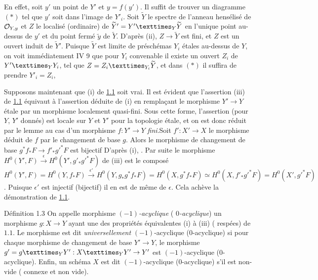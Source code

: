 \documentclass[10pt]{../fichiers-configuration-latex/smfart}
\begin{document}
En effet, soit $y'$ un point de $Y'$ et $y=f(y')$. Il suffit de
trouver un diagramme $({\ast})$ tel que $y'$ soit dans l'image de
$Y'_i$. Soit $\widetilde{Y}$ le spectre de l'anneau hensélisé de
${\mathcal O}_{Y,y}$ 
et $Z$ le localisé (ordinaire) de
$\widetilde{Y}'=\fprod{Y'}{\widetilde{Y}}{Y}$ en l'unique point
au-dessus de $y'$ et du point fermé $\widetilde{y}$ de
$\widetilde{Y}$. D'après  (ii), %
$Z\rightarrow \widetilde{Y}$
est fini, et $Z$ est un ouvert induit de $\widetilde{Y}'$. Puisque
$\widetilde{Y}$ est limite de préschémas $Y_i$ étales au-dessus de
$Y$, on voit immédiatement \EGA IV 9 que pour $Y_i$ convenable il
existe un ouvert $Z_i$ de $\fprod{Y'}{Y_i}{Y}$, tel que
$Z=\fprod{Z_i}{\widetilde{Y}}{Y_i}$, et dans $({\ast})$ il suffira de
prendre $Y'_i=Z_i$, \cqfd


Supposons maintenant que (i) de \hyperref[XV.prop1.1]{1.1} soit vrai. Il est évident que
l'assertion (iii) de \hyperref[XV.prop1.1]{1.1} équivaut à l'assertion déduite de (i) en
remplaçant le morphisme $Y'\rightarrow Y$ étale par un morphisme
localement quasi-fini. Sous cette forme, l'assertion (pour $Y$, $Y'$
donnés) est locale sur $Y$ et $Y'$ pour la topologie étale, et on est
donc réduit par le lemme au cas d'un morphisme $f:Y'\rightarrow Y$
\emph{fini}.\pageoriginale Soit $f':X'\rightarrow X$ le morphisme
déduit de $f$ par le changement de base $g$. Alors le morphisme de
changement de base $g^{\ast}f_{\ast}F\rightarrow
{f'}_{\ast}{g'}^{\ast}F$ est bijectif 
D'après (i),
.
Par suite le morphisme $H^{0}(Y',F)\xrightarrow{\epsilon}
H^{0}(Y',g'_{\ast}{g'}^{\ast}F)$ de (iii) est le composé
$H^{0}(Y',F)=H^{0}(Y,f_{\ast}F)\xrightarrow{\epsilon'}H^{0}(Y,g_{\ast}g^{\ast}f_{\ast}F)=H^{0}(X,g^{\ast}f_{\ast}F)\simeq
H^{0}(X,{f'}_{\ast}{g'}^{\ast}F)=H^{0}(X',{g'}^{\ast}F)$.
Puisque $\epsilon'$ est injectif (\resp bijectif) il en est de même de
$\epsilon$. Cela achève la démonstration de \hyperref[XV.prop1.1]{1.1}.

\begin{enonce*}{Définition 1.3}
On appelle morphisme \emph{$(-1)$-acyclique} (\resp
\emph{$0$-acyclique}) un morphisme $g:X\rightarrow Y$ ayant une des
propriétés équivalentes {\rm (i)} à {\rm (iii)} ( respées) de $1.1$. Le morphisme est dit
\emph{universellement} $(-1)$-acyclique (\resp $0$-acyclique) si pour
chaque morphisme de changement de base $Y'\rightarrow Y$, le morphisme
$g'=\fprod{g}{Y'}{Y}:\fprod{X}{Y'}{Y}\rightarrow Y'$ est
$(-1)$-acyclique (\resp $0$-acyclique). Enfin, un schéma $X$ est dit
$(-1)$-acyclique (\resp $0$-acyclique) s'il est non-vide (\resp
connexe et non vide).
\end{enonce*}
\end{document}
